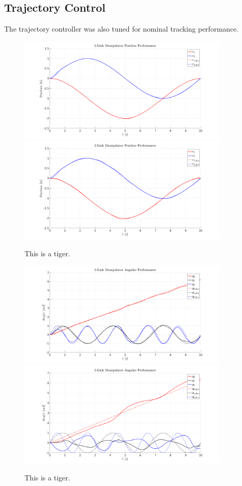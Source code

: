 \documentclass[letterpaper, 10 pt, conference]{ieeeconf}  %
\begin{document}
\subsection{Trajectory Control}

The trajectory controller was also tuned for nominal tracking performance.

\begin{figure}[]
	\centering
	\includegraphics[width=0.9\textwidth]{fl_pos_1.png}
	\includegraphics[width=0.9\textwidth]{fl_pos_2.png}\\
	\caption{This is a tiger.}
\end{figure}

\begin{figure}[]
	\centering
	\includegraphics[width=0.9\textwidth]{fl_ang_1.png}
	\includegraphics[width=0.9\textwidth]{fl_ang_2.png}
	\caption{This is a tiger.}
\end{figure}
\end{document}
